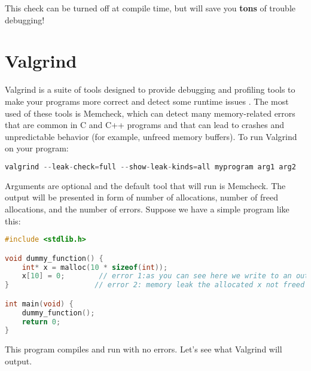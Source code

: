 This check can be turned off at compile time, but will save you \textbf{tons} of trouble debugging!

\section{Valgrind}

Valgrind is a suite of tools designed to provide debugging and profiling tools to make your programs more correct and detect some runtime issues \cite{valgrind}.
The most used of these tools is Memcheck, which can detect many memory-related errors that are common in C and C++ programs and that can lead to crashes and unpredictable behavior (for example, unfreed memory buffers).
To run Valgrind on your program:

\begin{lstlisting}[language=C]
valgrind --leak-check=full --show-leak-kinds=all myprogram arg1 arg2
\end{lstlisting}

Arguments are optional and the default tool that will run is Memcheck.
The output will be presented in form of number of allocations, number of freed allocations, and the number of errors.
Suppose we have a simple program like this:

\begin{lstlisting}[language=C]
#include <stdlib.h>

void dummy_function() {
	int* x = malloc(10 * sizeof(int));
	x[10] = 0;        // error 1:as you can see here we write to an out of bound memory address
}                    // error 2: memory leak the allocated x not freed

int main(void) {
	dummy_function();
	return 0;
}
\end{lstlisting}

This program compiles and run with no errors. Let's see what Valgrind will output.

